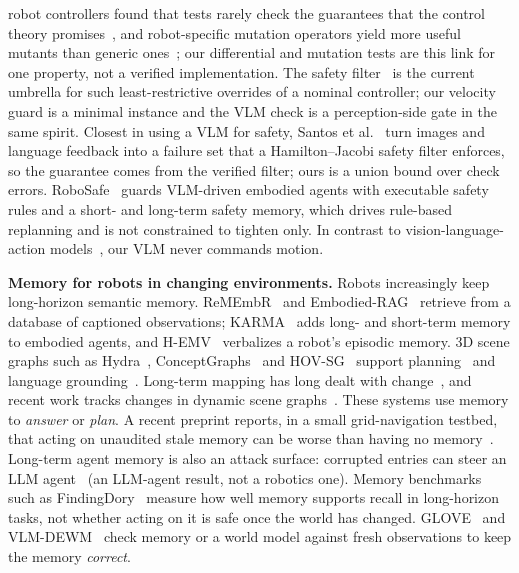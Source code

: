 \documentclass[conference]{IEEEtran}
\begin{document}
robot controllers found that tests rarely check the guarantees that the control theory promises~\cite{chur2026controlartifact}, and robot-specific mutation operators yield more useful mutants than generic ones~\cite{santos2025robotmutation}; our differential and mutation tests are this link for one property, not a verified implementation.
The safety filter~\cite{hsu2024safetyfilter} is the current umbrella for such least-restrictive overrides of a nominal controller; our velocity guard is a minimal instance and the VLM check is a perception-side gate in the same spirit.
Closest in using a VLM for safety, Santos et al.~\cite{santos2025updating} turn images and language feedback into a failure set that a Hamilton--Jacobi safety filter enforces,
so the guarantee comes from the verified filter; ours is a union bound over check errors. RoboSafe~\cite{wang2025robosafe} guards VLM-driven embodied agents with executable safety rules and a short- and long-term safety memory, which drives rule-based replanning and is not constrained to tighten only.
In contrast to vision-language-action models~\cite{zitkovich2023rt2,kim2025openvla}, our VLM never commands motion.

\textbf{Memory for robots in changing environments.}
Robots increasingly keep long-horizon semantic memory. ReMEmbR~\cite{anwar2025remembr} and Embodied-RAG~\cite{xie2024embodiedrag} retrieve from a database of captioned observations; KARMA~\cite{wang2025karma} adds long- and
short-term memory to embodied agents, and H-EMV~\cite{barmann2025hemv} verbalizes a robot's episodic memory. 3D scene graphs such as Hydra~\cite{hughes2022hydra}, ConceptGraphs~\cite{gu2024conceptgraphs} and HOV-SG~\cite{werby2024hovsg} support planning~\cite{rana2023sayplan} and language grounding~\cite{huang2023vlmaps}. Long-term mapping has long dealt with change~\cite{biber2005dynamic,krajnik2017fremen}, and recent work tracks changes in dynamic scene graphs~\cite{schmid2024khronos,behrens2025lostfound}. These systems use memory to \emph{answer} or \emph{plan}. A recent preprint reports, in a small grid-navigation testbed, that acting on
unaudited stale memory can be worse than having no memory~\cite{sun2026memorylies}. Long-term agent memory is also an attack surface: corrupted entries can steer an LLM agent~\cite{chen2024agentpoison}
(an LLM-agent result, not a robotics one). Memory benchmarks such as FindingDory~\cite{yadav2025findingdory} measure how well memory supports recall in long-horizon tasks, not whether acting on it is safe once the world has changed. GLOVE~\cite{yin2026glove} and VLM-DEWM~\cite{tang2026vlmdewm} check memory or a world model against fresh observations to keep
the memory \emph{correct}.
\end{document}
